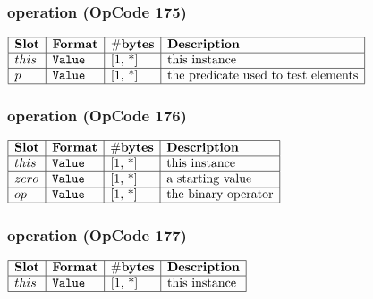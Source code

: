 \subsubsection{ operation (OpCode 175)}

\noindent
\(\begin{array}{| l | l | l | l |}
    \hline
    \bf{Slot} & \bf{Format} & \bf{\#bytes} & \bf{Description} \\
    \hline
         this & \lst{Value} & \text{[1, *]} & \text{this instance} \\
    \hline
           p & \lst{Value} & \text{[1, *]} & \text{the predicate used to test elements} \\
    \hline
      
\end{array}\)
       

\subsubsection{ operation (OpCode 176)}

\noindent
\(\begin{array}{| l | l | l | l |}
    \hline
    \bf{Slot} & \bf{Format} & \bf{\#bytes} & \bf{Description} \\
    \hline
         this & \lst{Value} & \text{[1, *]} & \text{this instance} \\
    \hline
           zero & \lst{Value} & \text{[1, *]} & \text{a starting value} \\
    \hline
           op & \lst{Value} & \text{[1, *]} & \text{the binary operator} \\
    \hline
      
\end{array}\)
       

\subsubsection{ operation (OpCode 177)}

\noindent
\(\begin{array}{| l | l | l | l |}
    \hline
    \bf{Slot} & \bf{Format} & \bf{\#bytes} & \bf{Description} \\
    \hline
         this & \lst{Value} & \text{[1, *]} & \text{this instance} \\
    \hline
      
\end{array}\)
       

